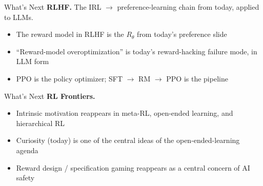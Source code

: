 \begin{frame}[t]{What's Next}
\vspace{0.4em}
\textbf{RLHF.} The IRL $\to$ preference-learning chain from today, applied to LLMs.
\vspace{0.5em}
\begin{itemize}
    \setlength{\itemsep}{0.6em}
    \item The reward model in RLHF is the $R_\theta$ from today's preference slide
    \item ``Reward-model overoptimization'' is today's reward-hacking failure mode, in LLM form
    \item PPO is the policy optimizer; SFT $\to$ RM $\to$ PPO is the pipeline
\end{itemize}
\end{frame}

\begin{frame}[t]{What's Next}
\vspace{0.4em}
\textbf{RL Frontiers.}
\vspace{0.5em}
\begin{itemize}
    \setlength{\itemsep}{0.7em}
    \item Intrinsic motivation reappears in meta-RL, open-ended learning, and hierarchical RL
    \item Curiosity (today) is one of the central ideas of the open-ended-learning agenda
    \item Reward design / specification gaming reappears as a central concern of AI safety
\end{itemize}
\end{frame}
